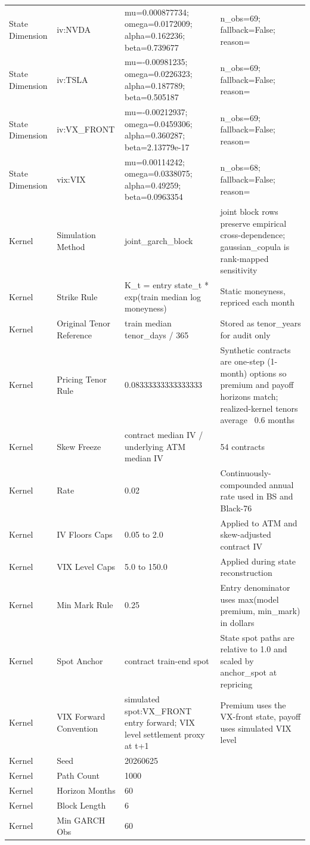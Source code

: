 \begin{tabular}{llll}
State Dimension & iv:NVDA & mu=0.000877734; omega=0.0172009; alpha=0.162236; beta=0.739677 & n\_obs=69; fallback=False; reason= \\
State Dimension & iv:TSLA & mu=-0.00981235; omega=0.0226323; alpha=0.187789; beta=0.505187 & n\_obs=69; fallback=False; reason= \\
State Dimension & iv:VX\_FRONT & mu=-0.00212937; omega=0.0459306; alpha=0.360287; beta=2.13779e-17 & n\_obs=69; fallback=False; reason= \\
State Dimension & vix:VIX & mu=0.00114242; omega=0.0338075; alpha=0.49259; beta=0.0963354 & n\_obs=68; fallback=False; reason= \\
Kernel & Simulation Method & joint\_garch\_block & joint block rows preserve empirical cross-dependence; gaussian\_copula is rank-mapped sensitivity \\
Kernel & Strike Rule & K\_t = entry state\_t * exp(train median log moneyness) & Static moneyness, repriced each month \\
Kernel & Original Tenor Reference & train median tenor\_days / 365 & Stored as tenor\_years for audit only \\
Kernel & Pricing Tenor Rule & 0.08333333333333333 & Synthetic contracts are one-step (1-month) options so premium and payoff horizons match; realized-kernel tenors average ~0.6 months \\
Kernel & Skew Freeze & contract median IV / underlying ATM median IV & 54 contracts \\
Kernel & Rate & 0.02 & Continuously-compounded annual rate used in BS and Black-76 \\
Kernel & IV Floors Caps & 0.05 to 2.0 & Applied to ATM and skew-adjusted contract IV \\
Kernel & VIX Level Caps & 5.0 to 150.0 & Applied during state reconstruction \\
Kernel & Min Mark Rule & 0.25 & Entry denominator uses max(model premium, min\_mark) in dollars \\
Kernel & Spot Anchor & contract train-end spot & State spot paths are relative to 1.0 and scaled by anchor\_spot at repricing \\
Kernel & VIX Forward Convention & simulated spot:VX\_FRONT entry forward; VIX level settlement proxy at t+1 & Premium uses the VX-front state, payoff uses simulated VIX level \\
Kernel & Seed & 20260625 &  \\
Kernel & Path Count & 1000 &  \\
Kernel & Horizon Months & 60 &  \\
Kernel & Block Length & 6 &  \\
Kernel & Min GARCH Obs & 60 &  \\
\bottomrule
\end{tabular}
